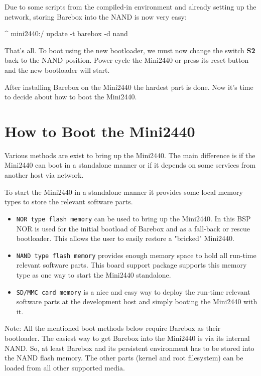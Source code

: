 Due to some scripts from the compiled-in environment and already setting up the
network, storing Barebox into the NAND is now very easy:

\begin{ptxshell}[escapechar=|]{^}
mini2440:/ update -t barebox -d nand
\end{ptxshell}

That's all. To boot using the new bootloader, we must now change the switch
\textbf{S2} back to the NAND position. Power cycle the Mini2440 or press its
reset button and the new bootloader will start.

After installing Barebox on the Mini2440 the hardest part is done. Now it's
time to decide about how to boot the Mini2440.

\chapter{How to Boot the Mini2440}	\label{sec:bootingmini2440}

Various methods are exist to bring up the Mini2440. The main difference is if
the Mini2440 can boot in a standalone manner or if it depends on some services
from another host via network.

To start the Mini2440 in a standalone manner it provides some local memory types
to store the relevant software parts.

\begin{itemize}
\item \texttt{NOR type flash memory} can be used to bring up the Mini2440. In
	this BSP NOR is used for the initial bootload of Barebox and as a
	fall-back or rescue bootloader. This allows the user to easily restore
	a "bricked" Mini2440.
\item \texttt{NAND type flash memory} provides enough memory space to hold all
	run-time relevant software parts. This board support package supports
	this memory type as one way to start the Mini2440 standalone.
\item \texttt{SD/MMC card memory} is a nice and easy way to deploy the run-time
	relevant software parts at the development host and simply booting
	the Mini2440 with it.
\end{itemize}

Note: All the mentioned boot methods below require Barebox as their bootloader.
The easiest way to get Barebox into the Mini2440 is via its internal NAND. So,
at least Barebox and its persistent environment has to be stored into the NAND
flash memory. The other parts (kernel and root filesystem) can be loaded from
all other supported media.

